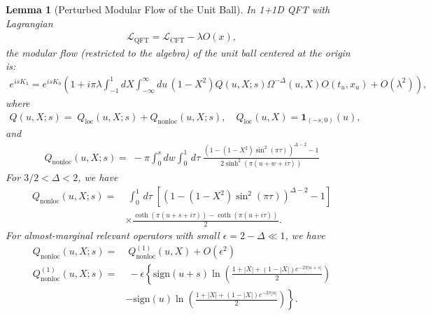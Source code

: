 \documentclass[a4paper,11pt]{article}
\newtheorem{lemma}[theorem]{Lemma}
\theoremstyle{definition}
\newcommand{\ep}{\epsilon}
\newcommand{\KL}[1]{\textcolor{brown}{#1}}
\begin{document}
\begin{lemma} [Perturbed Modular Flow of the Unit Ball]
    In 1+1D QFT with Lagrangian
    \begin{align}
        \mathcal{L}_\text{QFT} = \mathcal{L}_\text{CFT} - \lambda O(x),  
    \end{align}
    the modular flow (restricted to the algebra) of the unit ball centered at the origin is:
    \begin{gather}
        e^{is K_\lambda } = e^{is K_0} \left(1 + i\pi \lambda \int_{-1}^1 dX \int_{-\infty}^{\infty} du \, (1-X^2) Q(u,X;s) \Omega^{-\Delta}(u,X) O(t_u,x_u) +O(\lambda^2)\right),
    \end{gather}
    where
    \begin{gather}
        Q(u,X;s) =\; Q_{\text{loc}}(u,X;s) + Q_{\text{nonloc}}(u,X;s), \quad Q_{\text{loc}}(u,X) = \textbf{1}_{(-s,0)}(u),
    \end{gather}
    and 
    \begin{align}
        Q_{\text{nonloc}}(u,X;s) =\; -\pi\int_0^s dw\int_0^1 \, d\tau  \;\frac{\left(1 - (1-X^2)\sin^2(\pi \tau)\right)^{\Delta-2} -1}{2\sinh^2(\pi (u+w+i\tau))}
    \end{align}
    For $3/2<\Delta <2$, we have
    \begin{align}
        Q_{\text{nonloc}}(u,X;s) =&\; \int_0^1 \, d\tau \; \left[\left(1 - (1-X^2)\sin^2(\pi \tau)\right)^{\Delta-2} -1\right] \nonumber\\
        &\times\frac{\coth(\pi(u+s+i\tau)) - \coth(\pi(u+i\tau))}{2}.
    \end{align}
    For almost-marginal relevant operators with small $\ep = 2- \Delta \ll 1$, we have
    \begin{align}
        Q_{\text{nonloc}}(u,X;s) =&\; Q^{(1)}_{\text{nonloc}}(u,X) + O(\epsilon^2)\\
        Q^{(1)}_{\text{nonloc}}(u,X;s) =&\; -\epsilon\left\{ \text{sign}(u+s)\ln\left(\frac{1+|X| +(1-|X|)e^{-2\pi|u+s|}}{2}\right) \right. \nonumber\\
        & \left.- \text{sign}(u)\ln\left(\frac{1+|X| +(1-|X|)e^{-2\pi|u|}}{2}\right) \right\}.
    \end{align}
\end{lemma}
\end{document}
